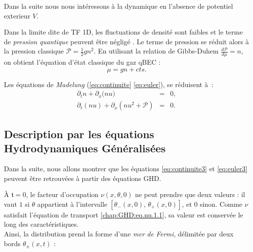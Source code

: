 \medskip
Dans la suite nous nous intéressons à la dynamique en l'absence de potentiel exterieur $V$.
  


\medskip
Dans la limite dite de \gls{TF} 1D, les fluctuations de densité sont faibles et le terme de \emph{pression quantique} peuvent être négligé \cite{PhysRevA.58.2385}.  Le terme de pression se réduit alors à la pression classique 
\(
    \mathcal{P} = \frac{1}{2} g n^2.
\)
En utilisant la relation de Gibbs-Duhem 
\(
    \frac{d\mathcal{P}}{d\mu} = n,
\)
on obtient l’équation d’état classique du gaz \gls{qBEC} : 
\begin{equation}
    \mu = g n + cts.
\end{equation}

Les équations de \emph{Madelung} (\eqref{eq:continuite} \eqref{eq:euler}), se réduisent à :
\begin{eqnarray}
    \partial_t n + \partial_x \big( n u \big) &=& 0, \label{eq:continuite3}\\
    \partial_t (n u) + \partial_x \left( n u^2 + \mathcal{P} \right) &=& 0 \label{eq:euler3}.
\end{eqnarray}

\subsection{Description par les équations Hydrodynamiques Généralisées} 
 
Dans la suite, nous allons montrer que les équations \eqref{eq:continuite3} et \eqref{eq:euler3} peuvent être retrouvées à partir des équations \gls{GHD}.

\medskip

À $\mathfrak{t}=0$, le facteur d’occupation $\nu(x,\theta,0)$ ne peut prendre que deux valeurs :  il vaut $1$ si $\theta$ appartient à l’intervalle $[\theta_-(x,0),\, \theta_+(x,0)]$, et $0$ sinon.  Comme $\nu$ satisfait l’équation de transport \eqref{chap:GHD:eq.nu.1.1}, sa valeur est conservée le long des caractéristiques. \\ 

Ainsi, la distribution prend la forme d’une \emph{mer de Fermi}, délimitée par deux bords $\theta_\pm(x,t)$ :  

